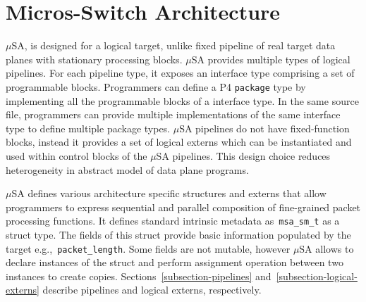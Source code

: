 \documentclass[10pt,sigconf,letterpaper,anonymous]{acmart}
\begin{document}
\section{Micros-Switch Architecture}
\label{section-micros-awitch-architecture}
$\mu$SA, is designed for a logical target, unlike fixed pipeline of real target data planes with stationary processing blocks.
$\mu$SA provides multiple types of logical pipelines.
For each pipeline type, it exposes an interface type comprising a set of programmable blocks.
Programmers can define a P4 \texttt{package} type by implementing all the programmable blocks of a interface type.
In the same source file, programmers can provide multiple implementations of the same interface type to define multiple package types.
$\mu$SA pipelines do not have fixed-function blocks, instead it provides a set of logical externs which can be instantiated and used within control blocks of the $\mu$SA pipelines.
This design choice reduces heterogeneity in abstract model of data plane programs.

$\mu$SA defines various architecture specific structures and externs that allow programmers to express sequential and parallel composition of fine-grained packet processing functions.
It defines standard intrinsic metadata as~\texttt{msa\_sm\_t} as a struct type.
The fields of this struct provide basic information populated by the target e.g.,~\texttt{packet\_length}.
Some fields are not mutable, however $\mu$SA allows to declare instances of the struct and perform assignment operation between two instances to create copies.
Sections~\ref{subsection-pipelines} and~\ref{subsection-logical-externs} describe pipelines and logical externs, respectively.
\end{document}
